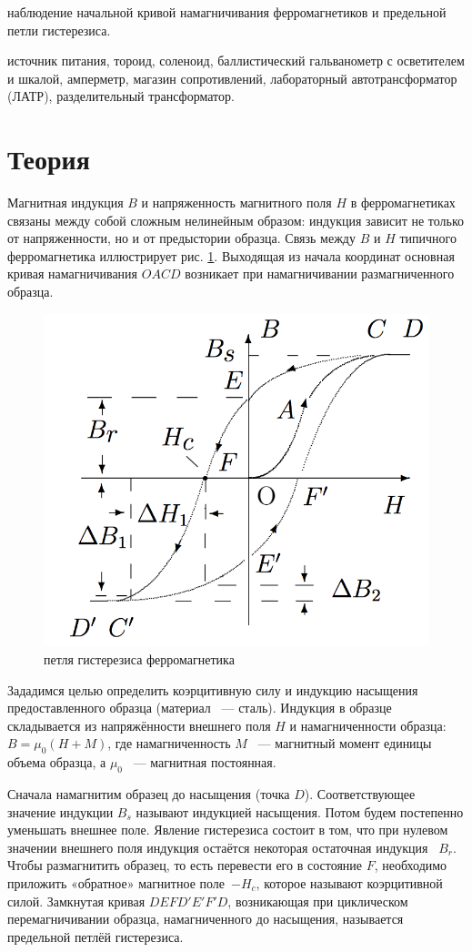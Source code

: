 \documentclass[a4paper,14pt]{article}
\begin{document}
\author{Рябых Владислав и Исыпов Илья, Б05-905}
\title{}
\maketitle

 наблюдение начальной кривой намагничивания ферромагнетиков и предельной петли гистерезиса.

 источник питания, тороид, соленоид, баллистический гальванометр с осветителем и шкалой, амперметр, магазин сопротивлений, лабораторный автотрансформатор (ЛАТР), разделительный трансформатор.


\section*{Теория}
Магнитная индукция $B$ и напряженность магнитного поля $H$ в ферромагнетиках связаны между собой сложным нелинейным образом: индукция зависит не только от напряженности, но и от предыстории образца. Связь между $B$ и $H$ типичного ферромагнетика иллюстрирует рис. \ref{pic1}. Выходящая из начала координат основная кривая намагничивания $OACD$ возникает при намагничивании размагниченного образца.

\begin{center}
\begin{figure}[bhtp]
	\centering
	\includegraphics[width=0.32\linewidth]{pic1.png}
	\caption{петля гистерезиса ферромагнетика}
	\label{pic1}
\end{figure}
\end{center}

Зададимся целью определить коэрцитивную силу и индукцию насыщения предоставленного образца (материал ~--- сталь).
Индукция в образце складывается из напряжённости внешнего поля $H$ и намагниченности образца: 
$B = \mu_0 (H + M)$, где намагниченность $M$ ~--- магнитный момент единицы объема образца, а $\mu_0$ ~--- магнитная постоянная.

Сначала намагнитим образец до насыщения (точка $D$). Соответствующее значение индукции $B_s$ называют индукцией насыщения. Потом будем постепенно уменьшать внешнее поле. Явление гистерезиса состоит в том, что при нулевом значении внешнего поля индукция остаётся некоторая остаточная индукция ~$B_r$. Чтобы размагнитить образец, то есть перевести его в состояние $F$, необходимо приложить «обратное» магнитное поле~$-H_c$, которое называют коэрцитивной силой.
Замкнутая кривая $DEFD'E'F'D$, возникающая при циклическом перемагничивании образца, намагниченного до насыщения, называется предельной петлёй гистерезиса.
\end{document}
